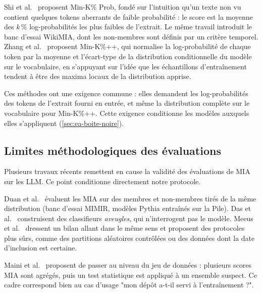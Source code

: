 		Shi et al.~\cite{shi2024} proposent Min-K\% Prob, fondé sur l'intuition qu'un texte non vu contient quelques tokens aberrants de faible probabilité : le score est la moyenne des $k\,\%$ log-probabilités les plus faibles de l'extrait. Le même travail introduit le banc d'essai WikiMIA, dont les non-membres sont définis par un critère temporel. Zhang et al.~\cite{zhang2025} proposent Min-K\%++, qui normalise la log-probabilité de chaque token par la moyenne et l'écart-type de la distribution conditionnelle du modèle sur le vocabulaire, en s'appuyant sur l'idée que les échantillons d'entraînement tendent à être des maxima locaux de la distribution apprise. 

		Ces méthodes ont une exigence commune : elles demandent les log-probabilités des tokens de l'extrait fourni en entrée, et même la distribution complète sur le vocabulaire pour Min-K\%++. Cette exigence conditionne les modèles auxquels elles s'appliquent (\cref{sec:ea-boite-noire}).

	\subsection{Limites méthodologiques des évaluations}\label{sec:ea-critique}
		Plusieurs travaux récents remettent en cause la validité des évaluations de MIA sur les LLM. Ce point conditionne directement notre protocole.

		Duan et al.~\cite{duan2024} évaluent les MIA sur des membres et non-membres tirés de la même distribution (banc d'essai MIMIR, modèles Pythia entraînés sur la Pile).  Das et al.~\cite{das2024} construisent des classifieurs \emph{aveugles}, qui n'interrogent pas le modèle.  Meeus et al.~\cite{meeus2024} dressent un bilan allant dans le même sens et proposent des protocoles plus sûrs, comme des partitions aléatoires contrôlées ou des données dont la date d'inclusion est certaine.

		Maini et al.~\cite{maini2024} proposent de passer au niveau du jeu de données : plusieurs scores MIA sont agrégés, puis un test statistique est appliqué à un ensemble suspect. Ce cadre correspond bien au cas d'usage "mon dépôt a-t-il servi à l'entraînement ?".

